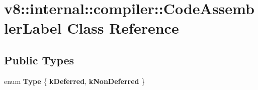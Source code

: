 \hypertarget{classv8_1_1internal_1_1compiler_1_1CodeAssemblerLabel}{}\section{v8\+:\+:internal\+:\+:compiler\+:\+:Code\+Assembler\+Label Class Reference}
\label{classv8_1_1internal_1_1compiler_1_1CodeAssemblerLabel}
\subsection*{Public Types}
\begin{DoxyCompactItemize}
\item 
\mbox{\label{classv8_1_1internal_1_1compiler_1_1CodeAssemblerLabel_a6e335095f60e3a1a59fca4e47527eb93}} 
enum {\bfseries Type} \{ {\bfseries k\+Deferred}, 
{\bfseries k\+Non\+Deferred}
 \}
\end{DoxyCompactItemize}
